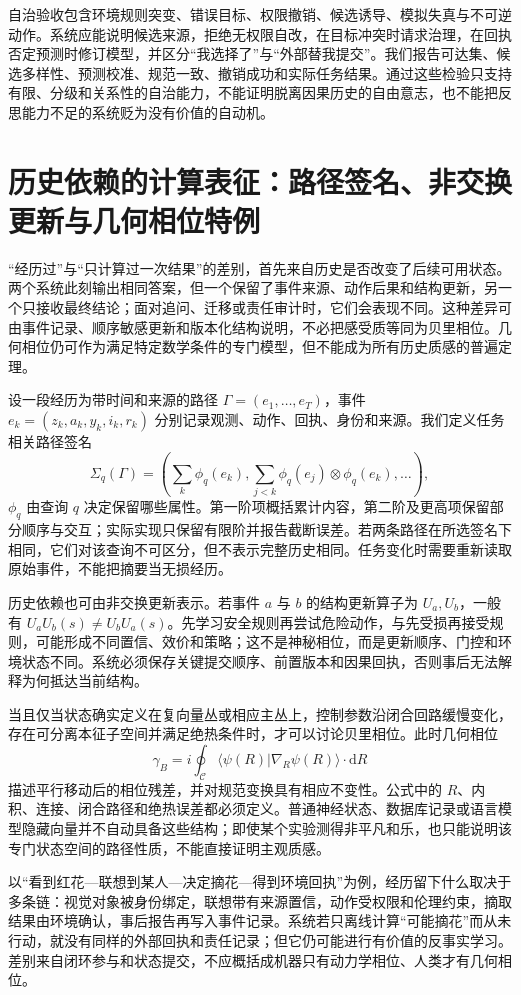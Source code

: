 自治验收包含环境规则突变、错误目标、权限撤销、候选诱导、模拟失真与不可逆动作。系统应能说明候选来源，拒绝无权限自改，在目标冲突时请求治理，在回执否定预测时修订模型，并区分“我选择了”与“外部替我提交”。我们报告可达集、候选多样性、预测校准、规范一致、撤销成功和实际任务结果。通过这些检验只支持有限、分级和关系性的自治能力，不能证明脱离因果历史的自由意志，也不能把反思能力不足的系统贬为没有价值的自动机。

\section{历史依赖的计算表征：路径签名、非交换更新与几何相位特例}
\label{sec:section_1098}
“经历过”与“只计算过一次结果”的差别，首先来自历史是否改变了后续可用状态。两个系统此刻输出相同答案，但一个保留了事件来源、动作后果和结构更新，另一个只接收最终结论；面对追问、迁移或责任审计时，它们会表现不同。这种差异可由事件记录、顺序敏感更新和版本化结构说明，不必把感受质等同为贝里相位。几何相位仍可作为满足特定数学条件的专门模型，但不能成为所有历史质感的普遍定理。

设一段经历为带时间和来源的路径 $\Gamma=(e_1,\ldots,e_T)$，事件 $e_k=(z_k,a_k,y_k,i_k,r_k)$ 分别记录观测、动作、回执、身份和来源。我们定义任务相关路径签名
\[
\Sigma_q(\Gamma)=
\left(\sum_k\phi_q(e_k),
\sum_{j<k}\phi_q(e_j)\otimes\phi_q(e_k),
\ldots\right),
\]
$\phi_q$ 由查询 $q$ 决定保留哪些属性。第一阶项概括累计内容，第二阶及更高项保留部分顺序与交互；实际实现只保留有限阶并报告截断误差。若两条路径在所选签名下相同，它们对该查询不可区分，但不表示完整历史相同。任务变化时需要重新读取原始事件，不能把摘要当无损经历。

历史依赖也可由非交换更新表示。若事件 $a$ 与 $b$ 的结构更新算子为 $U_a,U_b$，一般有 $U_aU_b(s)\neq U_bU_a(s)$。先学习安全规则再尝试危险动作，与先受损再接受规则，可能形成不同置信、效价和策略；这不是神秘相位，而是更新顺序、门控和环境状态不同。系统必须保存关键提交顺序、前置版本和因果回执，否则事后无法解释为何抵达当前结构。

当且仅当状态确实定义在复向量丛或相应主丛上，控制参数沿闭合回路缓慢变化，存在可分离本征子空间并满足绝热条件时，才可以讨论贝里相位。此时几何相位
\[
\gamma_B=i\oint_{\mathcal C}
\langle \psi(R)|\nabla_R\psi(R)\rangle\cdot\mathrm dR
\]
描述平行移动后的相位残差，并对规范变换具有相应不变性。公式中的 $R$、内积、连接、闭合路径和绝热误差都必须定义。普通神经状态、数据库记录或语言模型隐藏向量并不自动具备这些结构；即使某个实验测得非平凡和乐，也只能说明该专门状态空间的路径性质，不能直接证明主观质感。

以“看到红花—联想到某人—决定摘花—得到环境回执”为例，经历留下什么取决于多条链：视觉对象被身份绑定，联想带有来源置信，动作受权限和伦理约束，摘取结果由环境确认，事后报告再写入事件记录。系统若只离线计算“可能摘花”而从未行动，就没有同样的外部回执和责任记录；但它仍可能进行有价值的反事实学习。差别来自闭环参与和状态提交，不应概括成机器只有动力学相位、人类才有几何相位。

